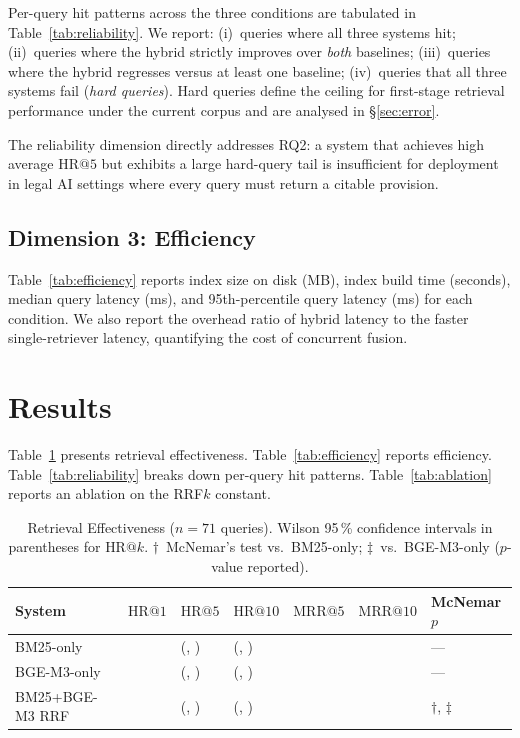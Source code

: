 \documentclass{iosart2x}
\makeatletter
\newcommand{\HR}[1]{\text{HR}@{#1}}
\newcommand{\MRR}[1]{\text{MRR}@{#1}}
\newcommand{\PH}{\text{[PLACEHOLDER]}\xspace}
\newcommand{\bgem}{BGE-M3\xspace}
\newcommand{\rrf}{RRF\xspace}
\makeatother
\begin{document}
Per-query hit patterns across the three conditions are tabulated in
Table~\ref{tab:reliability}.  We report: (i)~queries where all three
systems hit; (ii)~queries where the hybrid strictly improves over
\emph{both} baselines; (iii)~queries where the hybrid regresses versus
at least one baseline; (iv)~queries that all three systems fail
(\emph{hard queries}).  Hard queries define the ceiling for first-stage
retrieval performance under the current corpus and are analysed in
\S\ref{sec:error}.

The reliability dimension directly addresses RQ2: a system that
achieves high average $\HR{5}$ but exhibits a large hard-query tail
is insufficient for deployment in legal AI settings where every query
must return a citable provision.

\subsection{Dimension 3: Efficiency}
\label{sec:eval-efficiency}

Table~\ref{tab:efficiency} reports index size on disk (MB), index
build time (seconds), median query latency (ms), and 95th-percentile
query latency (ms) for each condition.  We also report the overhead
ratio of hybrid latency to the faster single-retriever latency,
quantifying the cost of concurrent fusion.

\section{Results}
\label{sec:results}

Table~\ref{tab:effectiveness} presents retrieval effectiveness.
Table~\ref{tab:efficiency} reports efficiency.
Table~\ref{tab:reliability} breaks down per-query hit patterns.
Table~\ref{tab:ablation} reports an ablation on the \rrf $k$ constant.

\begin{table}[t]
\caption{Retrieval Effectiveness ($n{=}71$ queries).
  Wilson 95\,\% confidence intervals in parentheses for $\HR{k}$.
  $\dagger$~McNemar's test vs.\ BM25-only; $\ddagger$~vs.\ \bgem-only
  ($p$-value reported).}
\label{tab:effectiveness}
\centering
\small
\begin{tabular}{@{}lllllll@{}}
\toprule
System
  & $\HR{1}$
  & $\HR{5}$
  & $\HR{10}$
  & $\MRR{5}$
  & $\MRR{10}$
  & McNemar $p$ \\
\midrule
BM25-only
  & \PH
  & \PH{} (\PH, \PH)
  & \PH{} (\PH, \PH)
  & \PH
  & \PH
  & --- \\[2pt]
\bgem-only
  & \PH
  & \PH{} (\PH, \PH)
  & \PH{} (\PH, \PH)
  & \PH
  & \PH
  & --- \\[2pt]
BM25+\bgem{} RRF
  & \PH
  & \PH{} (\PH, \PH)
  & \PH{} (\PH, \PH)
  & \PH
  & \PH
  & $\dagger$\PH, $\ddagger$\PH \\
\bottomrule
\end{tabular}
\end{table}
\end{document}
